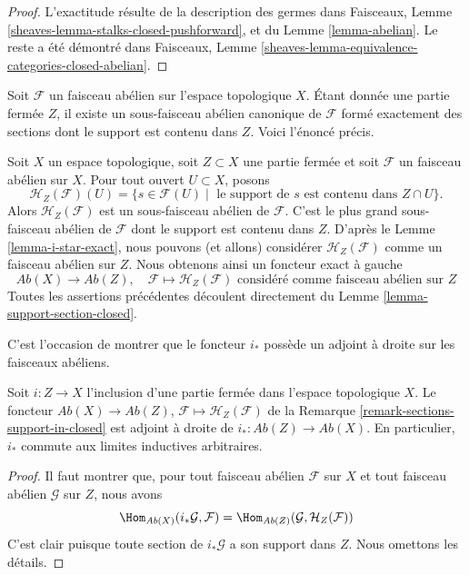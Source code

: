 \begin{proof}
L'exactitude résulte de la description des germes dans Faisceaux, Lemme
\ref{sheaves-lemma-stalks-closed-pushforward}, et du Lemme
\ref{lemma-abelian}. Le reste a été démontré dans Faisceaux, Lemme
\ref{sheaves-lemma-equivalence-categories-closed-abelian}.
\end{proof}

\noindent
Soit $\mathcal{F}$ un faisceau abélien sur l'espace topologique $X$. Étant
donnée une partie fermée $Z$, il existe un sous-faisceau abélien canonique de
$\mathcal{F}$ formé exactement des sections dont le support est contenu dans
$Z$. Voici l'énoncé précis.

\begin{remark}
\label{remark-sections-support-in-closed}
Soit $X$ un espace topologique, soit $Z \subset X$ une partie fermée et soit
$\mathcal{F}$ un faisceau abélien sur $X$. Pour tout ouvert $U \subset X$,
posons
$$
\mathcal{H}_Z(\mathcal{F})(U) =
\{s \in \mathcal{F}(U) \mid
\text{ le support de }s\text{ est contenu dans }Z \cap U\}.
$$
Alors $\mathcal{H}_Z(\mathcal{F})$ est un sous-faisceau abélien de
$\mathcal{F}$. C'est le plus grand sous-faisceau abélien de $\mathcal{F}$ dont
le support est contenu dans $Z$. D'après le Lemme \ref{lemma-i-star-exact},
nous pouvons (et allons) considérer $\mathcal{H}_Z(\mathcal{F})$ comme un
faisceau abélien sur $Z$. Nous obtenons ainsi un foncteur exact à gauche
$$
\textit{Ab}(X) \longrightarrow \textit{Ab}(Z),\quad
\mathcal{F} \longmapsto \mathcal{H}_Z(\mathcal{F})
\text{ considéré comme faisceau abélien sur }Z
$$
Toutes les assertions précédentes découlent directement du Lemme
\ref{lemma-support-section-closed}.
\end{remark}

\noindent
C'est l'occasion de montrer que le foncteur $i_*$ possède un adjoint à droite
sur les faisceaux abéliens.

\begin{lemma}
\label{lemma-i-star-right-adjoint}
Soit $i : Z \to X$ l'inclusion d'une partie fermée dans l'espace topologique
$X$. Le foncteur $\textit{Ab}(X) \to \textit{Ab}(Z)$,
$\mathcal{F} \mapsto \mathcal{H}_Z(\mathcal{F})$ de la Remarque
\ref{remark-sections-support-in-closed} est adjoint à droite de
$i_* : \textit{Ab}(Z) \to \textit{Ab}(X)$. En particulier, $i_*$ commute aux
limites inductives arbitraires.
\end{lemma}

\begin{proof}
Il faut montrer que, pour tout faisceau abélien $\mathcal{F}$ sur $X$ et tout
faisceau abélien $\mathcal{G}$ sur $Z$, nous avons
$$
\Hom_{\textit{Ab}(X)}(i_*\mathcal{G}, \mathcal{F}) =
\Hom_{\textit{Ab}(Z)}(\mathcal{G}, \mathcal{H}_Z(\mathcal{F}))
$$
C'est clair puisque toute section de $i_*\mathcal{G}$ a son support dans $Z$.
Nous omettons les détails.
\end{proof}

